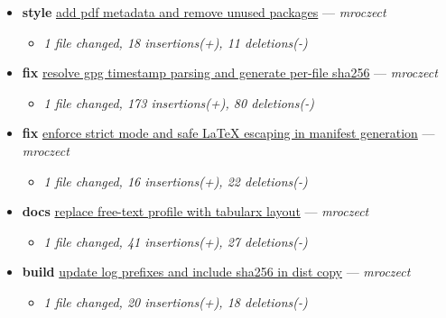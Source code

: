 \begin{itemize}[leftmargin=1.5em]
  \begin{itemize}[leftmargin=1.5em]
    \item \small\textit{1 file changed, 2 insertions(+), 1 deletion(-)}
  \end{itemize}
  \item \textbf{style} \href{https://github.com/mroczect/mroczect.github.io/commit/c65e80c14bead3dbf63be72df9aa224b5986411b}{add pdf metadata and remove unused packages} --- \textit{mroczect}
  \begin{itemize}[leftmargin=1.5em]
    \item \small\textit{1 file changed, 18 insertions(+), 11 deletions(-)}
  \end{itemize}
  \item \textbf{fix} \href{https://github.com/mroczect/mroczect.github.io/commit/2b902dab327e2819b6579c10437faf956a03ec85}{resolve gpg timestamp parsing and generate per-file sha256} --- \textit{mroczect}
  \begin{itemize}[leftmargin=1.5em]
    \item \small\textit{1 file changed, 173 insertions(+), 80 deletions(-)}
  \end{itemize}
  \item \textbf{fix} \href{https://github.com/mroczect/mroczect.github.io/commit/6ec0635df3db7c68ac36370725d15126cad1e8f3}{enforce strict mode and safe LaTeX escaping in manifest generation} --- \textit{mroczect}
  \begin{itemize}[leftmargin=1.5em]
    \item \small\textit{1 file changed, 16 insertions(+), 22 deletions(-)}
  \end{itemize}
  \item \textbf{docs} \href{https://github.com/mroczect/mroczect.github.io/commit/35c82367c6ba7f7070076714fff1034632bf45aa}{replace free-text profile with tabularx layout} --- \textit{mroczect}
  \begin{itemize}[leftmargin=1.5em]
    \item \small\textit{1 file changed, 41 insertions(+), 27 deletions(-)}
  \end{itemize}
  \item \textbf{build} \href{https://github.com/mroczect/mroczect.github.io/commit/c813cefc136c83a2a0cf1ebaf7b0ae2748eb96ec}{update log prefixes and include sha256 in dist copy} --- \textit{mroczect}
  \begin{itemize}[leftmargin=1.5em]
    \item \small\textit{1 file changed, 20 insertions(+), 18 deletions(-)}

\end{itemize}
\end{itemize}
